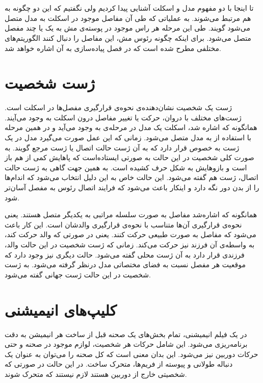 \section{
}

تا اینجا با دو مفهوم مدل و اسکلت آشنایی پیدا کردیم ولی نگفتیم که این دو چگونه به هم مرتبط می‌شوند.
به عملیاتی که طی آن مفاصل موجود در اسکلت به مدل متصل می‌شود 
گویند.
طی این مرحله هر راس موجود در پوسته‌ی مش به یک یا چند مفصل متصل می‌شود.
برای اینکه چگونه رئوس مش، این مفاصل را دنبال کنند الگوریتم‌های مختلفی مطرح شده است که در فصل پیاده‌سازی به آن اشاره ‌خواهد شد.


\section{ژست شخصیت}

ژست یک شخصیت نشان‌دهنده‌ی نحوه‌ی قرارگیری مفصل‌ها در اسکلت است. ژست‌های مختلف با دروان، حرکت یا تغییر مفاصل درون اسکلت به وجود می‌‌آیند.
همانگونه که اشاره شد، اسکلت یک مدل در مرحله‌ی 
به وجود می‌‌آید و در همین مرحله با استفاده از 
 به مدل متصل می‌شود. زمانی که این عمل صورت می‌گیرد مدل در یک ژست به خصوص قرار دارد که به آن ژست حالت اتصال
یا
ژست مرجع
گویند.
به صورت کلی شخصیت در این حالت به صورتی ایستاده‌است که پاهایش کمی از هم باز است و 
بازو‌هایش به شکل حرف
کشیده است. به همین جهت گاهی به ژست حالت اتصال،
ژست
هم گفته می‌شود.
این حالت خاص به این دلیل انتخاب می‌شود که اندام‌ها را از بدن دور نگه دارد و اینکار باعث می‌شود که 
فرایند اتصال رئوس به مفصل آسان‌تر شود.

همانگونه که اشاره‌‌شد مفاصل به صورت سلسله مراتبی به یکدیگر متصل هستند. یعنی نحوه‌ی 
قرارگیری آن‌ها متناسب با نحوه‌ی قرارگیری والدشان است.
این کار باعث می‌شود که مفاصل به صورت طبیعی حرکت کنند. یعنی در صورتی که والد حرکت کند، به واسطه‌ی 
آن فرزند نیز حرکت می‌کند.
زمانی که ژست شخصیت در این حالت والد، فرزندی قرار دارد به آن ژست محلی
گفته می‌شود. حالت دیگری نیز وجود دارد که موقعیت هر مفصل نسبت به فضای مختصاتی مدل 
درنظر گرفته می‌شود. به ژست شخصیت در این حالت ژست جهانی
گفته می‌شود.

\section{‌کلیپ‌های انیمیشنی}

در یک فیلم انیمیشنی، تمام بخش‌های یک صحنه قبل از ساخت هر انیمیشن به دقت برنامه‌ریزی می‌شود.
این شامل حرکات هر شخصیت، لوازم موجود در صحنه و حتی حرکات دوربین نیز می‌شود.
این بدان معنی است که کل صحنه را می‌توان به عنوان یک دنباله طولانی و پیوسته از فریم‌ها، متحرک ساخت.
در این حالت در صورتی که شخصیتی خارج از دوربین هستند لازم نیستند که متحرک شوند.

